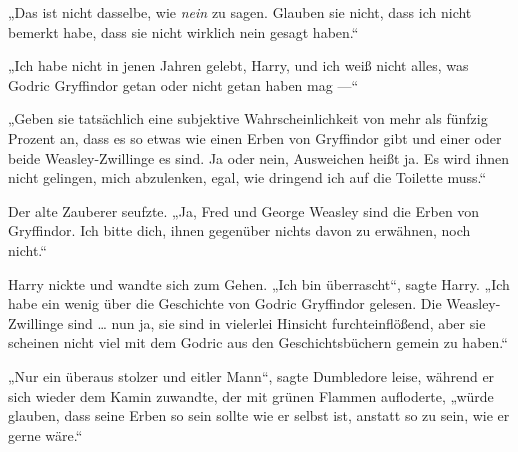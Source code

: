 „Das ist nicht dasselbe, wie \emph{nein} zu sagen. Glauben sie nicht, dass ich nicht bemerkt habe, dass sie nicht wirklich nein gesagt haben.“

„Ich habe nicht in jenen Jahren gelebt, Harry, und ich weiß nicht alles, was Godric Gryffindor getan oder nicht getan haben mag —“

„Geben sie tatsächlich eine subjektive Wahrscheinlichkeit von mehr als fünfzig Prozent an, dass es so etwas wie einen Erben von Gryffindor gibt und einer oder beide Weasley-Zwillinge es sind. Ja oder nein, Ausweichen heißt ja. Es wird ihnen nicht gelingen, mich abzulenken, egal, wie dringend ich auf die Toilette muss.“

Der alte Zauberer seufzte.
„Ja, Fred und George Weasley sind die Erben von Gryffindor. Ich bitte dich, ihnen gegenüber nichts davon zu erwähnen, noch nicht.“

Harry nickte und wandte sich zum Gehen.
„Ich bin überrascht“, sagte Harry.
„Ich habe ein wenig über die Geschichte von Godric Gryffindor gelesen. Die Weasley-Zwillinge sind … nun ja, sie sind in vielerlei Hinsicht furchteinflößend, aber sie scheinen nicht viel mit dem Godric aus den Geschichtsbüchern gemein zu haben.“

„Nur ein überaus stolzer und eitler Mann“, sagte Dumbledore leise, während er sich wieder dem Kamin zuwandte, der mit grünen Flammen aufloderte, „würde glauben, dass seine Erben so sein sollte wie er selbst ist, anstatt so zu sein, wie er gerne wäre.“


